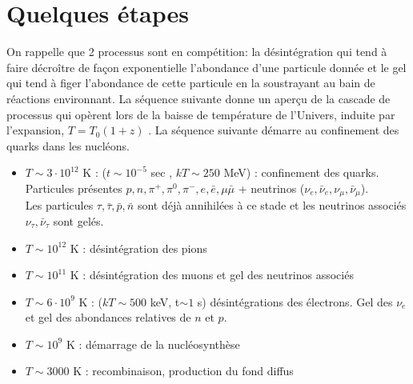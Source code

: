\section{Quelques étapes}
On rappelle que 2 processus sont en compétition: la désintégration qui tend à faire décroître de façon exponentielle l'abondance d'une particule donnée et le gel qui tend à figer l'abondance de cette particule en la soustrayant au bain de réactions environnant. La séquence suivante donne un aperçu de la cascade de processus qui opèrent lors de la baisse de température de l'Univers, induite par l'expansion, $T=T_0(1+z)$ . La séquence suivante démarre au confinement des quarks dans les nucléons.
\newline
\begin{itemize}
\item $T\sim 3\cdot 10^{12}$ K : ($t\sim 10^{-5}$ sec , $kT \sim 250$ MeV) : confinement des quarks. Particules présentes $p,n, \pi^+,\pi^0, \pi^-, e,\bar e, \mu \bar \mu$ + neutrinos ($\nu_e,\bar \nu_e, \nu_\mu, \bar \nu_\mu$).\\
Les particules $\tau, \bar \tau, \bar p, \bar n$  sont déjà annihilées à ce stade et les neutrinos associés $\nu_\tau, \bar \nu_\tau$ sont gelés.
 \item $T\sim 10^{12}$ K : désintégration des pions
 \item $T\sim 10^{11}$ K : désintégration des muons et gel des neutrinos associés
 \item $T\sim 6 \cdot 10^{9}$ K : ($kT \sim 500$ keV, t$\sim 1$ s) désintégrations des électrons. Gel des $\nu_e$ et gel des abondances relatives de $n$ et $p$.
 \item $T\sim 10^9$ K : démarrage de la nucléosynthèse
 \item $T\sim 3000$ K : recombinaison, production du fond diffus
\end{itemize}

